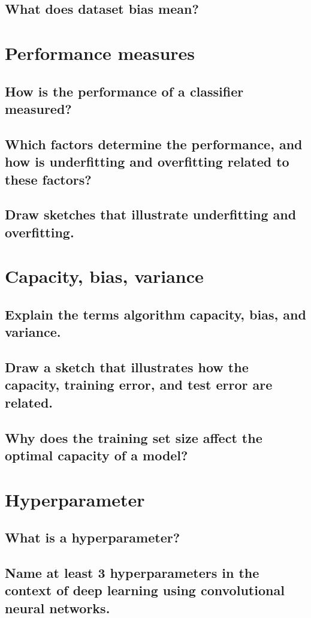 \subsection{What does dataset bias mean? }

\section{Performance measures}
\subsection{How is the performance of a classifier measured?}
\subsection{Which factors determine the performance, and how is underfitting and overfitting related to these factors?}
\subsection{Draw sketches that illustrate underfitting and overfitting.}

\section{Capacity, bias, variance}
\subsection{Explain the terms algorithm capacity, bias, and variance.}
\subsection{Draw a sketch that illustrates how the capacity, training error, and test error are related.}
\subsection{Why does the training set size affect the optimal capacity of a model?}

\section{Hyperparameter}
\subsection{What is a hyperparameter?}
\subsection{Name at least 3 hyperparameters in the context of deep learning using convolutional neural networks.}
